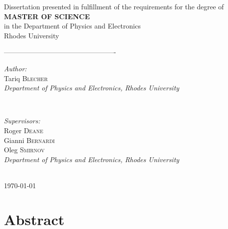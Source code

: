 \begin{titlepage}
\begin{center}
 {\large Dissertation presented in fulfillment of the requirements for the degree of} \\
 {\large \textbf{MASTER OF SCIENCE}} \\
 {\large in the Department of Physics and Electronics} \\
 {\large Rhodes University}
\end{center}
\vspace{0.15\textheight}
-------------------------------------------------
\begin{minipage}{0.4\textwidth}
\begin{flushleft} \large
\emph{Author:} \\
Tariq \textsc{Blecher} \\
{\small \textit{Department of Physics and Electronics, Rhodes University}}\\
\end{flushleft}
\end{minipage}
~
\begin{minipage}{0.4\textwidth}
\begin{flushright} \large
\emph{Supervisors:} \\
Roger \textsc{Deane} \\
Gianni \textsc{Bernardi} \\
Oleg \textsc{Smirnov} \\
{\small \textit{Department of Physics and Electronics, Rhodes University}}
\end{flushright}
\end{minipage}\\[3cm]


{\large \today}\\[1.5cm] %

\vfill %

\end{titlepage}

\chapter*{Abstract}

